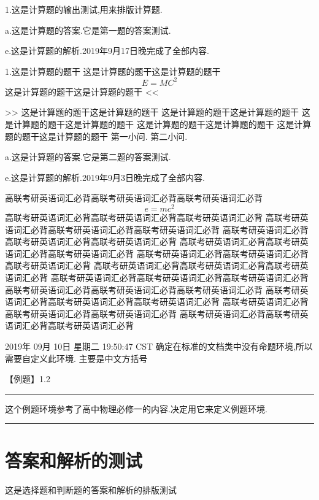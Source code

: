 \documentclass[a4paper,fontset = windowsnew]{ctexart}
\begin{document}
\begin{calculations}
  1.这是计算题的输出测试,用来排版计算题.

  a.这是计算题的答案.它是第一题的答案测试.

e.这是计算题的解析.2019年9月17日晚完成了全部内容.

1.这是计算题的题干
这是计算题的题干这是计算题的题干
\[  E=MC^2 \]
这是计算题的题干这是计算题的题干
<<
>>
这是计算题的题干这是计算题的题干
这是计算题的题干这是计算题的题干
这是计算题的题干这是计算题的题干
这是计算题的题干这是计算题的题干
这是计算题的题干这是计算题的题干
\qitem 第一小问.
\qitem 第二小问.

  a.这是计算题的答案.它是第二题的答案测试.

e.这是计算题的解析.2019年9月3日晚完成了全部内容.

\end{calculations}

%
高联考研英语词汇必背高联考研英语词汇必背高联考研英语词汇必背
\[e=mc^2\]
高联考研英语词汇必背高联考研英语词汇必背高联考研英语词汇必背
高联考研英语词汇必背高联考研英语词汇必背高联考研英语词汇必背
高联考研英语词汇必背高联考研英语词汇必背高联考研英语词汇必背
高联考研英语词汇必背高联考研英语词汇必背高联考研英语词汇必背
高联考研英语词汇必背高联考研英语词汇必背高联考研英语词汇必背
高联考研英语词汇必背高联考研英语词汇必背高联考研英语词汇必背
高联考研英语词汇必背高联考研英语词汇必背高联考研英语词汇必背
高联考研英语词汇必背高联考研英语词汇必背高联考研英语词汇必背
高联考研英语词汇必背高联考研英语词汇必背高联考研英语词汇必背
高联考研英语词汇必背高联考研英语词汇必背高联考研英语词汇必背
高联考研英语词汇必背高联考研英语词汇必背高联考研英语词汇必背



2019年 09月 10日 星期二 19:50:47 CST
确定在标准的文档类中没有命题环境,所以需要自定义此环境.
主要是中文方括号

\parindent=0pt
【{\heiti 例题}】1.2
\vspace{2pt}
\hrule
\vspace{10pt}

\ccwd
 这个例题环境参考了高中物理必修一的内容.决定用它来定义例题环境.

\vspace{10pt}
\hrule

\newpage
\section{答案和解析的测试}

这是选择题和判断题的答案和解析的排版测试

\makeanswer
\end{document}
